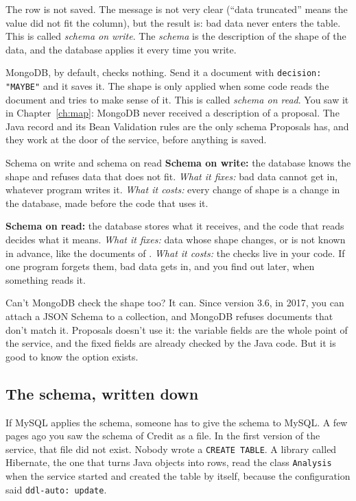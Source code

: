 The row is not saved. The message is not very clear (``data truncated''
means the value did not fit the column), but the result is: bad data never
enters the table. This is called \emph{schema on write}. The \emph{schema} is
the description of the shape of the data, and the database applies it every
time you write.

MongoDB, by default, checks nothing. Send it a document with
\texttt{decision: "MAYBE"} and it saves it. The shape is only applied when
some code reads the document and tries to make sense of it. This is called
\emph{schema on read}. You saw it in Chapter~\ref{ch:map}: MongoDB never
received a description of a proposal. The Java record and its Bean
Validation rules are the only schema Proposals has, and they work at the
door of the service, before anything is saved.

\begin{concept}{Schema on write and schema on read}
\textbf{Schema on write:} the database knows the shape and refuses data that
does not fit. \emph{What it fixes:} bad data cannot get in, whatever program
writes it. \emph{What it costs:} every change of shape is a change in the
database, made before the code that uses it.

\textbf{Schema on read:} the database stores what it receives, and the code
that reads decides what it means. \emph{What it fixes:} data whose shape
changes, or is not known in advance, like the documents of .
\emph{What it costs:} the checks live in your code. If one program forgets
them, bad data gets in, and you find out later, when something reads it.
\end{concept}

\begin{question}{Can't MongoDB check the shape too?}
It can. Since version 3.6, in 2017, you can attach a JSON Schema to a
collection, and MongoDB refuses documents that don't match it. Proposals
doesn't use it: the variable fields are the whole point of the service, and
the fixed fields are already checked by the Java code. But it is good to know
the option exists.
\end{question}

\subsection*{The schema, written down}

If MySQL applies the schema, someone has to give the schema to MySQL. A few
pages ago you saw the schema of Credit as a file. In the first version of
the service, that file did not exist.
Nobody wrote a \texttt{CREATE TABLE}. A library called Hibernate, the one
that turns Java objects into rows, read the class \texttt{Analysis} when the
service started and created the table by itself, because the configuration
said \texttt{ddl-auto: update}.

